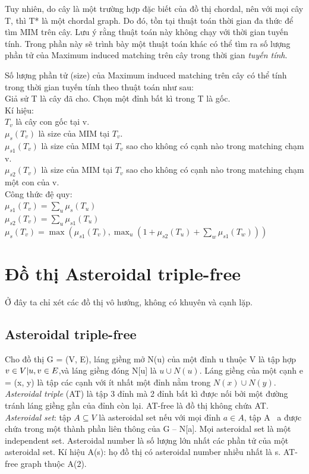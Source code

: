 \documentclass[14pt,a4paper]{extreport}
\begin{document}
Tuy nhiên, do cây là một trường hợp đặc biết của đồ thị chordal, nên với mọi cây T, thì T* là một chordal graph. Do đó, tồn tại thuật toán thời gian đa thức để tìm MIM trên cây. Lưu ý rằng thuật toán này không chạy với thời gian tuyến tính. Trong phần này sẽ trình bày một thuật toán khác có thể tìm ra số lượng phần tử của Maximum induced matching trên cây trong thời gian \textit{tuyến tính}.

Số lượng phần tử (size) của Maximum induced matching trên cây có thể tính trong thời gian tuyến tính theo thuật toán như sau:\\
Giả sử T là cây đã cho. Chọn một đỉnh bất kì trong T là gốc. \\
Kí hiệu:\\
$ T_{v} $ là cây con gốc tại v.\\
$ \mu_{s}(T_{v}) $ là size của MIM tại $ T_{v} $.\\
$ \mu_{s1}(T_{v}) $ là size của MIM tại $ T_{v} $ sao cho không có cạnh nào trong matching chạm v.\\
$ \mu_{s2}(T_{v}) $ là size của MIM tại $ T_{v} $ sao cho không có cạnh nào trong matching chạm một con của v.\\
Công thức đệ quy:\\

$ \mu_{s1}(T_{v}) = \sum_{u }\mu_{s}(T_{u}) $ \\

$ \mu_{s2}(T_{v}) = \sum_{u }\mu_{s1}(T_{u}) $ \\

$ \mu_{s}(T_{v}) = \max (\mu_{s1}(T_{v}), \max_{u} (1 +  \mu_{s2}(T_{u}) + \sum_{w } \mu_{s1}(T_{w})))$ \\


\chapter{Đồ thị Asteroidal triple-free}

Ở đây ta chỉ xét các đồ thị vô hướng, không có khuyên và cạnh lặp.

\section{Asteroidal triple-free}
Cho đồ thị G = (V, E), láng giềng mở N(u) của một đỉnh u thuộc V là tập hợp $ {v \in V \arrowvert {u, v} \in E } $,và láng giềng đóng N[u] là $ {u} \cup N(u) $. Láng giềng của một cạnh e = (x, y) là tập các cạnh với ít nhất một đỉnh nằm trong   $ N(x) \cup N(y) $.\\
\textit{Asteroidal triple} (AT) là tập 3 đỉnh mà 2 đỉnh bất kì được nối bởi một đường tránh láng giềng gần của đỉnh còn lại. AT-free là đồ thị không chứa AT.\\
\textit{Asteroidal set}: tập $ A \subseteq V $ là asteroidal set nếu với mọi đỉnh $  a \in A $, tập A \ {a} được chứa trong một thành phần liên thông của G – N[a]. Mọi asteroidal set là một independent set. Asteroidal number là số lượng lớn nhất các phần tử của một asteroidal set. Kí hiệu A(s): họ đồ thị có asteroidal number nhiều nhất là s. AT-free graph thuộc A(2).
\end{document}
